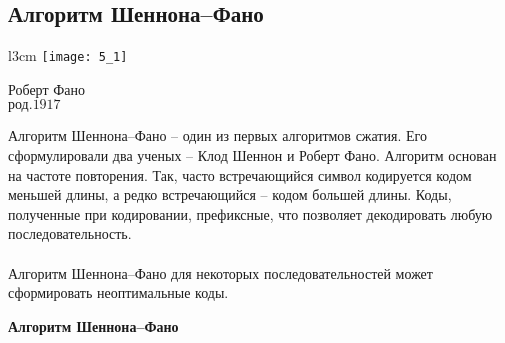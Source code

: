 \subsection{Алгоритм Шеннона--Фано}
\begin{wrapfigure}[13]{l}{3cm}
\texttt{[image: 5\_1]}
\begin{center}
\caption{}
\footnotesize{Роберт Фано}
\\\footnotesize{$\mbox{род.} 1917$}
\end{center}
\end{wrapfigure}
Алгоритм Шеннона--Фано -- один из первых алгоритмов сжатия. Его сформулировали два ученых -- Клод Шеннон и Роберт Фано. Алгоритм основан на частоте повторения. Так, часто встречающийся символ кодируется кодом меньшей длины, а редко встречающийся -- кодом большей длины.
Коды, полученные при кодировании, префиксные, что позволяет декодировать любую последовательность.
\\
\\Алгоритм Шеннона--Фано для некоторых последовательностей может сформировать неоптимальные коды.
\\
\begin{center}
\textbf{Алгоритм Шеннона--Фано}
\end{center}

